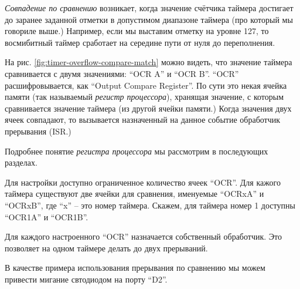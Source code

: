 \documentclass[../sparc.tex]{subfiles}
\begin{document}

\emph{Совпадение по сравнению} возникает, когда значение счётчика таймера
достигает до заранее заданной отметки в допустимом диапазоне таймера (про
который мы говориле выше.)  Например, если мы выставим отметку на уровне 127, то
восмибитный таймер сработает на середине пути от нуля до переполнения.


На рис. \ref{fig:timer-overflow-compare-match} можно видеть, что значение
таймера сравнивается с двумя значениями: ``OCR A'' и ``OCR B''. ``OCR''
расшифровывается, как ``Output Compare Register''.  По сути это некая ячейка
памяти (так называемый \emph{регистр процессора}), хранящая значение, с которым
сравнивается значение таймера (из другой ячейки памяти.)  Когда значения двух
ячеек совпадают, то вызывается назначенный на данное событие обработчик
прерывания (\gls{ISR}.)

Подробнее понятие \emph{регистра процессора} мы рассмотрим в последующих
разделах.

Для настройки доступно ограниченное количество ячеек ``OCR''.  Для кажого
таймера существуют две ячейки для сравнения, именуемые ``OCRxA'' и ``OCRxB'',
где ``x'' -- это номер таймера.  Скажем, для таймера номер 1 доступны ``OCR1A'' и
``OCR1B''.

Для каждого настроенного ``OCR'' назначается собственный обработчик.  Это
позволяет на одном таймере делать до двух прерываний.

В качестве примера использования прерывания по сравнению мы можем привести
мигание свтодиодом на порту ``D2''.
\end{document}
